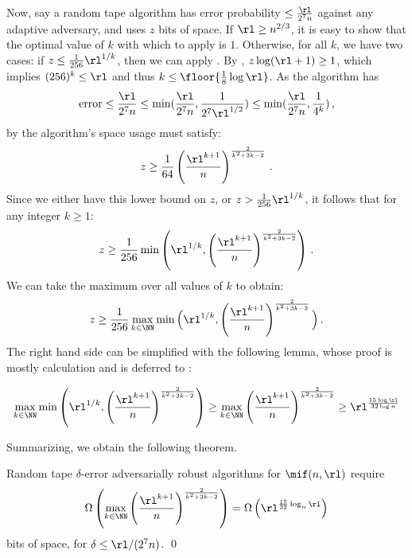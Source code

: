 \begin{itemize}
\begin{itemize}
Now, say a random tape algorithm has error probability $\le \frac{\rl}{2^{7} n}$ against any adaptive adversary, and uses $z$ bits of space. If $\rl \ge n^{2/3}$, it is easy to show that the optimal value of $k$ with which to apply  is $1$. Otherwise, for all $k$, we have two cases: if $z \le \frac{1}{256} \rl^{1/k}$, then we can apply . By , $z \log(\rl + 1) \ge 1$, which implies $(256)^k \le \rl$ and thus $k \le \floor{\frac{1}{8} \log \rl}$. As the algorithm has
\begin{align*}
  \text{error} \le \frac{\rl}{2^{7} n} \le \min(\frac{\rl}{2^{7} n}, \frac{1}{2^{7} \rl^{1/2}} ) \le \min(\frac{\rl}{2^{7} n}, \frac{1}{4^{k}}) \,,
\end{align*}
by  the algorithm's space usage must satisfy:
\begin{align*}
  z \ge \frac{1}{64} \left(\frac{\rl^{k + 1}}{n}\right)^{\frac{2}{k^2 + 3 k - 2}} \,.
\end{align*}
Since we either have this lower bound on $z$, or $z > \frac{1}{256} \rl^{1/k}$, it follows that for any integer $k \ge 1$:
\begin{align*}
  z \ge \frac{1}{256} \min\left(\rl^{1/k}, \left(\frac{\rl^{k + 1}}{n}\right)^{\frac{2}{k^2 + 3 k - 2}}\right)  \,.
\end{align*}
We can take the maximum over all values of $k$ to obtain:
\begin{align*}
  z \ge \frac{1}{256} \max_{k \in \NN} \min\Big(\rl^{1/k}, \left(\frac{\rl^{k + 1}}{n}\right)^{\frac{2}{k^2 + 3 k - 2}}\Big)  \,.
\end{align*}
The right hand side can be simplified with the following lemma, whose proof is mostly calculation and is deferred to :

\begin{lemma}\label{lem:rt-lb-calc-multiple}
  \begin{align}
    \max_{k \in \NN} \min\left(\rl^{1/k},\left(\frac{\rl^{k + 1}}{n}\right)^{\frac{2}{k^2 + 3 k - 2}}  \right) \ge  \max_{k \in \NN} \left(\frac{\rl^{k + 1}}{n}\right)^{\frac{2}{k^2 + 3 k - 2}}  \ge \rl^{\frac{15 \log \rl}{32 \log n}} \label{eq:rt-lb-max-min-lb}
  \end{align}
\end{lemma}

Summarizing, we obtain the following theorem.

\begin{theorem} %
\label{thm:rt-lb-intro}
  Random tape $\delta$-error adversarially robust algorithms for $\mif(n,\rl)$ require
  \begin{align*}
    \Omega\left(\max_{k \in \NN} \left(\frac{\rl^{k + 1}}{n}\right)^{\frac{2}{k^2 + 3 k - 2}}\right) 
    = \Omega\left(\rl^{\frac{15}{32} \log_{n} \rl}\right)
  \end{align*}
  bits of space, for $\delta \le \rl/(2^{7} n)$. \qed
\end{theorem}


\end{itemize}
\end{itemize}
